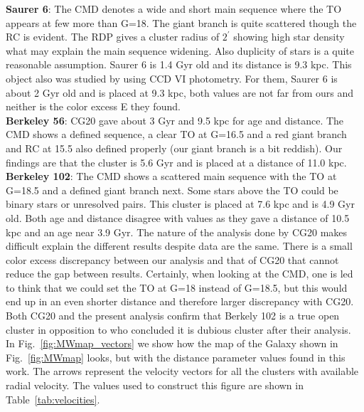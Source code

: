 \documentclass[draft]{aa}
\begin{document}
  \textbf{Saurer 6}: The CMD denotes a wide and short main sequence where the TO
  appears at few more than G=18. The giant branch is quite scattered though the
  RC is evident. The RDP gives a cluster radius of $2^{\prime}$ showing high
  star density what may explain the main sequence widening. Also duplicity of
  stars is a quite reasonable assumption. Saurer 6 is 1.4 Gyr old and its
  distance is 9.3 kpc. This object also was studied by
  \cite{Frinchaboy_2002} using CCD VI photometry. For them, Saurer 6 is about 2
  Gyr old and is placed at 9.3 kpc, both values are not far from ours and
  neither is the color excess E they found.\\

  \textbf{Berkeley 56}: CG20 gave about 3 Gyr and 9.5 kpc for age and distance. The CMD
  shows a defined sequence, a clear TO at G=16.5 and a red giant branch and RC
  at 15.5 also defined properly (our giant branch is a bit reddish).  Our
  findings are that the cluster is 5.6 Gyr and is placed at a distance of 11.0
  kpc.\\

  \textbf{Berkeley 102}: The CMD shows a scattered main sequence with the
  TO at G=18.5 and a defined giant branch next. Some stars above the TO could be
  binary stars or unresolved pairs. This cluster is placed at 7.6 kpc and is 4.9
  Gyr old. Both age and distance disagree with \cite{Cantat_2020}
  values as they gave a distance of 10.5 kpc and an age near
  3.9 Gyr. The nature of the analysis done by CG20 makes difficult
  explain the different results despite data are the same. There is a small
  color excess discrepancy between our analysis and that of CG20 that cannot
  reduce the gap between results. Certainly, when looking at the CMD, one is led
  to think that we could set the TO at G=18 instead of G=18.5, but this would
  end up in an even shorter distance and therefore larger discrepancy with CG20.
  Both CG20 and the present analysis confirm that Berkely 102 is a true open cluster
  in opposition to \cite{Maciejewski_2008} who concluded it is dubious cluster after their
  analysis.\\


  In Fig.~\ref{fig:MWmap_vectors} we show how the map of the Galaxy shown in
  Fig.~\ref{fig:MWmap} looks, but with the distance parameter values found in
  this work. The arrows represent the velocity vectors for all the clusters with
  available radial velocity. The values used to construct this figure are shown
  in Table~\ref{tab:velocities}.
 
\end{document}
